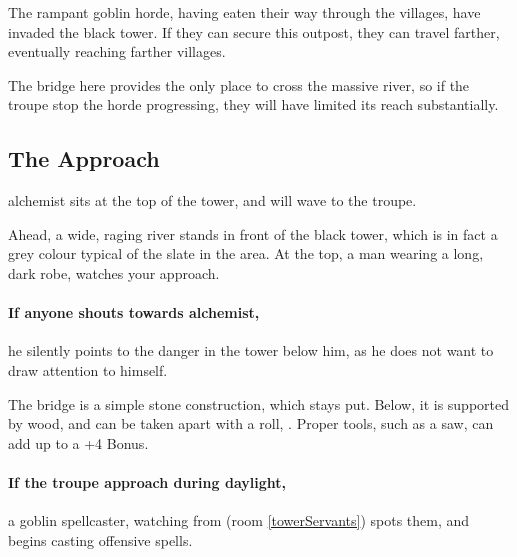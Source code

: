 \begin{multicols}{2}


\begin{exampletext}
  \noindent
  The rampant goblin horde, having eaten their way through the villages, have invaded the black tower.
  If they can secure this outpost, they can travel farther, eventually reaching farther villages.

  The bridge here provides the only place to cross the massive river, so if the troupe stop the horde progressing, they will have limited its reach substantially.
\end{exampletext}

\subsection{The Approach}

\Gls{alchemist} sits at the top of the tower, and will wave to the troupe.

\begin{boxtext}

  Ahead, a wide, raging river stands in front of the black tower, which is in fact a grey colour typical of the slate in the area.
  At the top, a man wearing a long, dark robe, watches your approach.

\end{boxtext}

\paragraph{If anyone shouts towards \gls{alchemist},}
he silently points to the danger in the tower below him, as he does not want to draw attention to himself.


The bridge is a simple stone construction, which stays put.
Below, it is supported by wood, and can be taken apart with a  roll, \tn[14].
Proper tools, such as a saw, can add up to a +4 Bonus.

\paragraph{If the troupe approach during daylight,}
a goblin spellcaster, watching from  (room \ref{towerServants}) spots them, and begins casting offensive spells.


\end{multicols}
